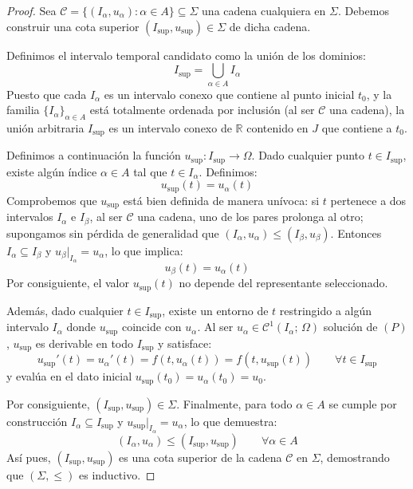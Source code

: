 \begin{proof}
    Sea $\mathcal{C} = \{ (I_\alpha, u_\alpha) : \alpha \in A \} \subseteq \Sigma$ una cadena cualquiera en $\Sigma$. Debemos construir una cota superior $(I_{\sup}, u_{\sup}) \in \Sigma$ de dicha cadena.
    
    Definimos el intervalo temporal candidato como la unión de los dominios:
    \[
        I_{\sup} = \bigcup_{\alpha \in A} I_\alpha
    \]
    Puesto que cada $I_\alpha$ es un intervalo conexo que contiene al punto inicial $t_0$, y la familia $\{I_\alpha\}_{\alpha \in A}$ está totalmente ordenada por inclusión (al ser $\mathcal{C}$ una cadena), la unión arbitraria $I_{\sup}$ es un intervalo conexo de $\mathbb{R}$ contenido en $J$ que contiene a $t_0$.

    Definimos a continuación la función $u_{\sup}: I_{\sup} \to \Omega$. Dado cualquier punto $t \in I_{\sup}$, existe algún índice $\alpha \in A$ tal que $t \in I_\alpha$. Definimos:
    \[
        u_{\sup}(t) = u_\alpha(t)
    \]
    Comprobemos que $u_{\sup}$ está bien definida de manera unívoca: si $t$ pertenece a dos intervalos $I_\alpha$ e $I_\beta$, al ser $\mathcal{C}$ una cadena, uno de los pares prolonga al otro; supongamos sin pérdida de generalidad que $(I_\alpha, u_\alpha) \leq (I_\beta, u_\beta)$. Entonces $I_\alpha \subseteq I_\beta$ y $u_\beta\big|_{I_\alpha} = u_\alpha$, lo que implica:
    \[
        u_\beta(t) = u_\alpha(t)
    \]
    Por consiguiente, el valor $u_{\sup}(t)$ no depende del representante seleccionado.

    Además, dado cualquier $t \in I_{\sup}$, existe un entorno de $t$ restringido a algún intervalo $I_\alpha$ donde $u_{\sup}$ coincide con $u_\alpha$. Al ser $u_\alpha \in \mathcal{C}^1(I_\alpha; \, \Omega)$ solución de $(P)$, $u_{\sup}$ es derivable en todo $I_{\sup}$ y satisface:
    \[
        u_{\sup}'(t) = u_\alpha'(t) = f(t, u_\alpha(t)) = f(t, u_{\sup}(t)) \qquad \forall t \in I_{\sup}
    \]
    y evalúa en el dato inicial $u_{\sup}(t_0) = u_\alpha(t_0) = u_0$.
    
    Por consiguiente, $(I_{\sup}, u_{\sup}) \in \Sigma$. Finalmente, para todo $\alpha \in A$ se cumple por construcción $I_\alpha \subseteq I_{\sup}$ y $u_{\sup}\big|_{I_\alpha} = u_\alpha$, lo que demuestra:
    \[
        (I_\alpha, u_\alpha) \leq (I_{\sup}, u_{\sup}) \qquad \forall \alpha \in A
    \]
    Así pues, $(I_{\sup}, u_{\sup})$ es una cota superior de la cadena $\mathcal{C}$ en $\Sigma$, demostrando que $(\Sigma, \leq)$ es inductivo.
\end{proof}

